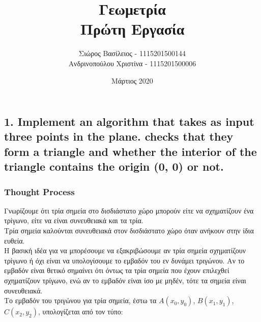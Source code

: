 \documentclass[12pt]{article}
\title{\hugeΥπολογιστική Γεωμετρία\\Πρώτη Εργασία}
\author{Σιώρος Βασίλειος - 1115201500144\\Ανδρινοπούλου Χριστίνα - 1115201500006}
\date{Μάρτιος 2020}
\begin{document}
\maketitle


\pagebreak


\subsection*{1. Implement an algorithm that takes as input three points in the plane. checks
    that they form a triangle and whether the interior of the triangle contains the origin (0, 0) or
    not.}

\subsubsection*{Thought Process}

Γνωρίζουμε ότι τρία σημεία στο δισδιάστατο χώρο μπορούν είτε να σχηματίζουν ένα τρίγωνο, είτε να είναι συνευθειακά και τα τρία. \\

 Τρία σημεία καλούνται συνευθειακά στον δισδιάστατο χώρο όταν ανήκουν στην ίδια ευθεία. \\
 
 Η βασική ιδέα για να μπορέσουμε να εξακριβώσουμε αν τρία σημεία σχηματίζουν τρίγωνο ή όχι είναι να υπολογίσουμε το εμβαδόν του εν δυνάμει τριγώνου. Αν το εμβαδόν είναι θετικό σημαίνει ότι όντως τα τρία σημεία που έχουν επιλεχθεί σχηματίζουν τρίγωνο, ενώ αν το εμβαδόν είναι ίσο με μηδέν, τότε τα σημεία είναι συνευθειακά. \\

Το εμβαδόν του τριγώνου για τρία σημεία, έστω τα \(A(x_0, y_0)\), \(B(x_1, y_1)\), \(C(x_2, y_2)\), υπολογίζεται από τον τύπο: 
\end{document}

